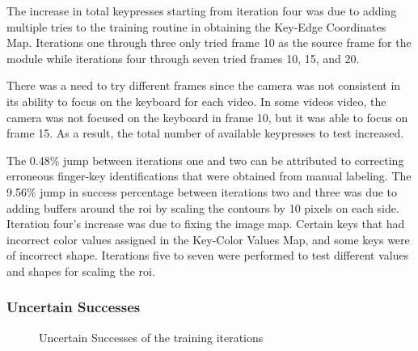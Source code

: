 \documentclass{report}
\begin{document}
The increase in total keypresses starting from iteration four was due to adding
multiple tries to the training routine in obtaining the Key-Edge Coordinates
Map. Iterations one through three only tried frame 10 as the source frame for
the module while iterations four through seven tried frames 10, 15, and 20.

There was a need to try different frames since the camera was not consistent in
its ability to focus on the keyboard for each video. In some videos video, the
camera was not focused on the keyboard in frame 10, but it was able to focus on
frame 15. As a result, the total number of available keypresses to test
increased.

The 0.48\% jump between iterations one and two can be attributed to correcting
erroneous finger-key identifications that were obtained from manual labeling.
The 9.56\% jump in success percentage between iterations two and three was due
to adding buffers around the \ac{roi} by scaling the contours by 10 pixels on
each side. Iteration four's increase was due to fixing the image map. Certain
keys that had incorrect color values assigned in the Key-Color Values Map, and
some keys were of incorrect shape. Iterations five to seven were performed to
test different values and shapes for scaling the \ac{roi}.

\subsubsection{Uncertain Successes}

\begin{figure}[H]
	\centering
	\caption{Uncertain Successes of the training iterations}
	\label{fig:rd-training-uncertain-successes}
\end{figure}
\end{document}
